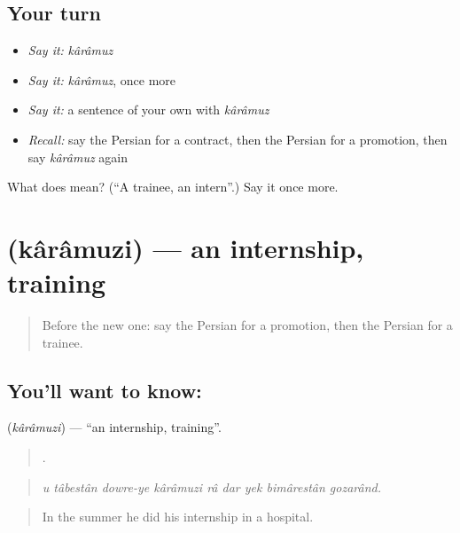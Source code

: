\subsection*{Your turn}
\begin{itemize}
\raggedright
  \item \emph{Say it:} \emph{kârâmuz}
  \item \emph{Say it:} \emph{kârâmuz}, once more
  \item \emph{Say it:} a sentence of your own with \emph{kârâmuz}
  \item \emph{Recall:} say the Persian for a contract, then the Persian for a promotion, then say \emph{kârâmuz} again
\end{itemize}

\begin{tcolorbox}[breakable,colback=teal!4,colframe=teal!35!black,title={Before you move on}]
What does  mean? (\textquotedblleft{}A trainee, an intern\textquotedblright{}.) Say it once more.
\end{tcolorbox}
\section[\texorpdfstring{\fa{کارآموزی} (kârâmuzi)}{کارآموزی (kârâmuzi)}]{ (kârâmuzi) — an internship, training}

\label{lesson:FA-C380-karamuzi}



\begin{quote}
Before the new one: say the Persian for a promotion, then the Persian for a trainee.
\end{quote}

\subsection*{You'll want to know: }
\textbf{} (\emph{kârâmuzi}) — \textquotedblleft{}an internship, training\textquotedblright{}.

\begin{quote}
        .
\end{quote}

\begin{quote}
\emph{u tâbestân dowre-ye kârâmuzi râ dar yek bimârestân gozarând.}
\end{quote}

\begin{quote}
In the summer he did his internship in a hospital.
\end{quote}

